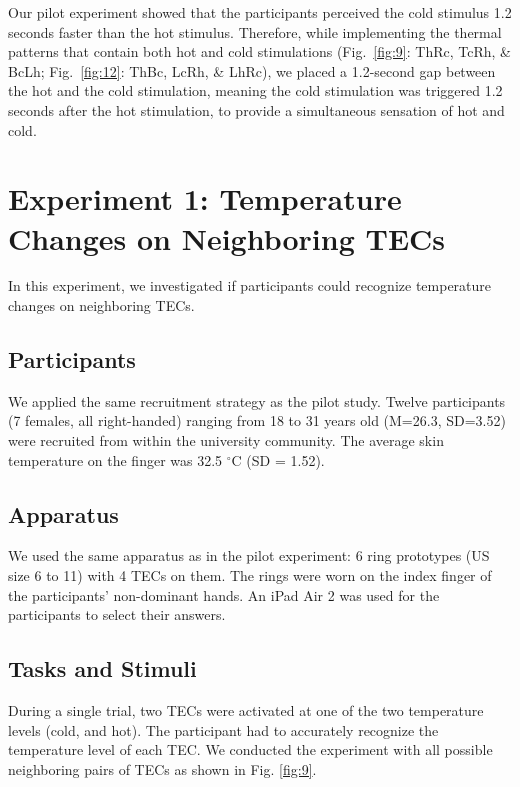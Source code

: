 \documentclass[preprint,12pt]{elsarticle}
\begin{document}
Our pilot experiment showed that the participants perceived the cold stimulus 1.2 seconds faster than the hot stimulus. Therefore, while implementing the thermal patterns that contain both hot and cold stimulations (Fig.~\ref{fig:9}: ThRc, TcRh, \& BcLh; Fig.~\ref{fig:12}: ThBc, LcRh, \& LhRc), we placed a 1.2-second gap between the hot and the cold stimulation, meaning the cold stimulation was triggered 1.2 seconds after the hot stimulation, to provide a simultaneous sensation of hot and cold.

\section{Experiment 1: Temperature Changes on Neighboring TECs}
In this experiment, we investigated if participants could recognize temperature changes on neighboring TECs.

\subsection{Participants}
We applied the same recruitment strategy as the pilot study. Twelve participants (7 females, all right-handed) ranging from 18 to 31 years old (M=26.3, SD=3.52) were recruited from within the university community. The average skin temperature on the finger was 32.5 $^{\circ}$C (SD = 1.52).

\subsection{Apparatus}
We used the same apparatus as in the pilot experiment: 6 ring prototypes (US size 6 to 11) with 4 TECs on them. The rings were worn on the index finger of the participants' non-dominant hands. An iPad Air 2 was used for the participants to select their answers.

\subsection{Tasks and Stimuli}
During a single trial, two TECs were activated at one of the two temperature levels (cold, and hot). The participant had to accurately recognize the temperature level of each TEC. We conducted the experiment with all possible neighboring pairs of TECs as shown in Fig. \ref{fig:9}.
\end{document}

